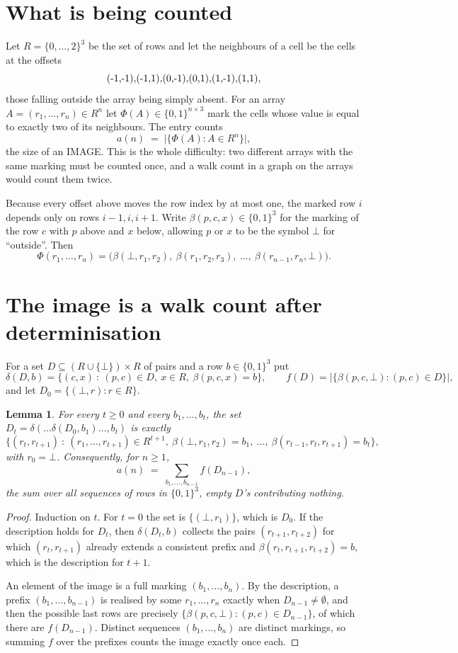 \documentclass[11pt,a4paper]{article}
\theoremstyle{plain}
\newtheorem{lemma}[theorem]{Lemma}
\theoremstyle{definition}
\begin{document}
\section{What is being counted}

Let $R=\{0,\dots,2\}^{3}$ be the set of rows and let the neighbours of a cell be the
cells at the offsets
\[
$(-1,-1)$, $(-1,1)$, $(0,-1)$, $(0,1)$, $(1,-1)$, $(1,1)$,
\]
those falling outside the array being simply absent. For an array
$A=(r_1,\dots,r_n)\in R^n$ let $\Phi(A)\in\{0,1\}^{n\times3}$ mark the cells whose value
is equal to exactly two of its neighbours. The entry counts
\[
a(n)\;=\;\bigl|\{\Phi(A):A\in R^n\}\bigr| ,
\]
the size of an IMAGE. This is the whole difficulty: two different arrays with the same marking
must be counted once, and a walk count in a graph on the arrays would count them twice.

Because every offset above moves the row index by at most one, the marked row $i$ depends only
on rows $i-1,i,i+1$. Write $\beta(p,c,x)\in\{0,1\}^{3}$ for the marking of the row $c$
with $p$ above and $x$ below, allowing $p$ or $x$ to be the symbol $\bot$ for ``outside''.
Then
\[
\Phi(r_1,\dots,r_n)=\bigl(\beta(\bot,r_1,r_2),\ \beta(r_1,r_2,r_3),\ \dots,\
\beta(r_{n-1},r_n,\bot)\bigr).
\]

\section{The image is a walk count after determinisation}

For a set $D\subseteq(R\cup\{\bot\})\times R$ of pairs and a row $b\in\{0,1\}^{3}$ put
\[
\delta(D,b)=\{(c,x)\ :\ (p,c)\in D,\ x\in R,\ \beta(p,c,x)=b\},\qquad
f(D)=\bigl|\{\beta(p,c,\bot):(p,c)\in D\}\bigr| ,
\]
and let $D_0=\{(\bot,r):r\in R\}$.

\begin{lemma}\label{lem:det}
For every $t\ge0$ and every $b_1,\dots,b_t$, the set
$D_t=\delta(\dots\delta(D_0,b_1)\dots,b_t)$ is exactly
\[
\{(r_t,r_{t+1})\ :\ (r_1,\dots,r_{t+1})\in R^{t+1},\ \beta(\bot,r_1,r_2)=b_1,\ \dots,\
\beta(r_{t-1},r_t,r_{t+1})=b_t\} ,
\]
with $r_0=\bot$. Consequently, for $n\ge1$,
\[
a(n)\;=\;\sum_{b_1,\dots,b_{n-1}}f(D_{n-1}),
\]
the sum over all sequences of rows in $\{0,1\}^{3}$, empty $D$'s contributing nothing.
\end{lemma}

\begin{proof}
Induction on $t$. For $t=0$ the set is $\{(\bot,r_1)\}$, which is $D_0$. If the description
holds for $D_t$, then $\delta(D_t,b)$ collects the pairs $(r_{t+1},r_{t+2})$ for which
$(r_t,r_{t+1})$ already extends a consistent prefix and
$\beta(r_t,r_{t+1},r_{t+2})=b$, which is the description for $t+1$.

An element of the image is a full marking $(b_1,\dots,b_n)$. By the description, a prefix
$(b_1,\dots,b_{n-1})$ is realised by some $r_1,\dots,r_n$ exactly when $D_{n-1}\neq
\emptyset$, and then the possible last rows are precisely
$\{\beta(p,c,\bot):(p,c)\in D_{n-1}\}$, of which there are $f(D_{n-1})$. Distinct
sequences $(b_1,\dots,b_n)$ are distinct markings, so summing $f$ over the prefixes counts the
image exactly once each.
\end{proof}
\end{document}
